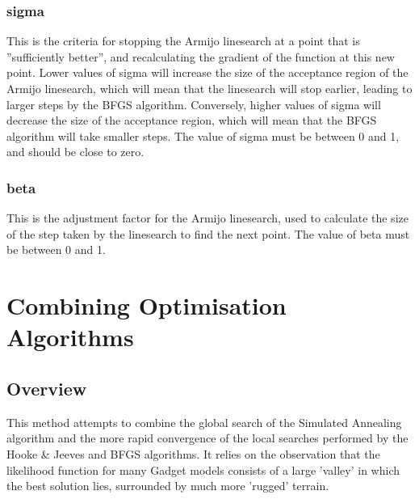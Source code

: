 \documentclass [a4paper, 10pt]{book}
\begin{document}
\subsubsection{sigma}
This is the criteria for stopping the Armijo linesearch at a point that is ''sufficiently better'', and recalculating the gradient of the function at this new point.  Lower values of sigma will increase the size of the acceptance region of the Armijo linesearch, which will mean that the linesearch will stop earlier, leading to larger steps by the BFGS algorithm.  Conversely, higher values of sigma will decrease the size of the acceptance region, which will mean that the BFGS algorithm will take smaller steps.  The value of sigma must be between 0 and 1, and should be close to zero.

\subsubsection{beta}
This is the adjustment factor for the Armijo linesearch, used to calculate the size of the step taken by the linesearch to find the next point.  The value of beta must be between 0 and 1.


\section{Combining Optimisation Algorithms}\label{sec:combine}
\subsection{Overview}\label{subsec:combineover}
This method attempts to combine the global search of the Simulated Annealing algorithm and the more rapid convergence of the local searches performed by the Hooke \& Jeeves and BFGS algorithms.  It relies on the observation that the likelihood function for many Gadget models consists of a large 'valley' in which the best solution lies, surrounded by much more 'rugged' terrain.
\end{document}
